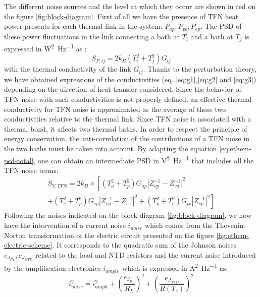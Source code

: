 The different noise sources and the level at which they occur are shown in red on the figure \ref{fig:block-diagram}. First of all we have the presence of TFN heat power presents for each thermal link in the system: $P_{ap}, P_{pb}, P_{ep}$. The PSD of these power fluctuations in the link connecting a bath at $T_i$ and a bath at $T_j$ is expressed in \si{\watt^2\per\Hz} as
\cite{Juillard:1999} \cite{Ashcroft:1976} :
\begin{equation}
S_{P,ij} = 2k_B(T_i^2 + T_j^2) G_{ij}
\end{equation}
with the thermal conductivity of the link $G_{ij}$.
Thanks to the perturbation theory, we have obtained expressions of the conductivities (eq. \ref{eq:g1},\ref{eq:g2} and \ref{eq:g3}) depending on the direction of heat transfer considered. Since the behavior of TFN noise with such conductivities is not properly defined, an effective thermal conductivity for TFN noise is approximated as the average of these two conductivities relative to the thermal link. Since TFN noise is associated with a thermal bond, it affects two thermal baths. In order to respect the principle of energy conservation, the anti-correlation of the contributions of a TFN noise in the two baths must be taken into account. By adapting the equation \ref{eq:ethem-psd-total}, one can obtain an intermediate PSD in \si{\volt^2\per\Hz} that includes all the TFN noise terms:
\begin{multline}
S_{V,TFN} = 2k_B \times  \left[ (T_a^2 + T_p^2) G_{ap} \left\vert Z_{vp}^{-1} - Z_{va}^{-1} \right\vert^2 \right. \\ \left. + (T_e^2 + T_p^2) G_{ep} \left\vert Z_{vp}^{-1} - Z_{ve}^{-1} \right\vert^2 + (T_p^2 + T_b^2) G_{pb} \left\vert Z_{vp}^{-1}\right\vert^2 \right]
\end{multline}
Following the noises indicated on the block diagram \ref{fig:block-diagram}, we now have the intervention of a current noise $i_{noise}$ which comes from the Thevenin-Norton transformation of the electric circuit presented on the figure \ref{fig:ethem-electric-scheme}. It corresponds to the quadratic sum of the Johnson noises $e_{J_{R_L}}, e_{J_{NTD}}$ related to the load and NTD resistors and the current noise introduced by the amplification electronics $i_{ampli.}$ which is expressed in \si{\ampere^2\per\Hz} as: 
\begin{equation}
\label{i-bruit}
i_{noise}^2 = i_{ampli}^2 + \left( \frac{e_{J_{R_L}}}{R_L} \right)^2 + \left( \frac{e_{J_{NTD}}}{R(T_e)} \right)^2
\end{equation}
